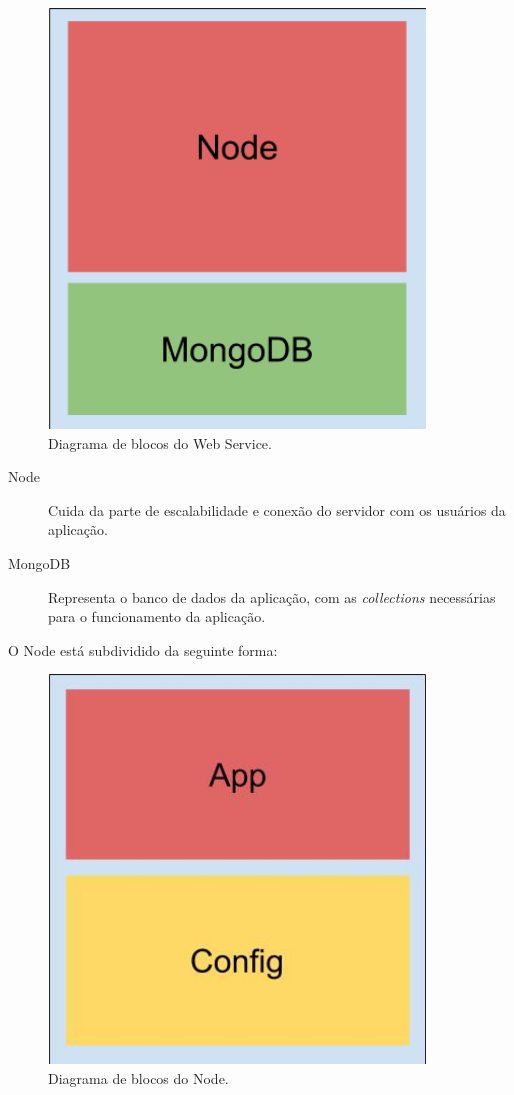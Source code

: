 \documentclass[
	12pt,				%
	oneside,			%
	a4paper,			%
	brazil				%
]{abntex2}
\begin{document}
{\begin{figure}[h]
\centering
\includegraphics[width=10cm, center]{images/brick_diagram_framework_webservice}
\caption{Diagrama de blocos do Web Service.}
\label{Rotulo}
\end{figure}

\begin{description}
\item[Node] Cuida da parte de escalabilidade e conexão do servidor com os usuários da aplicação.
\item[MongoDB] Representa o banco de dados da aplicação, com as \textit{collections} necessárias para o funcionamento da aplicação.
\end{description}

O Node está subdividido da seguinte forma:

\begin{figure}[h]
\centering
\includegraphics[width=10cm, center]{images/brick_diagram_node}
\caption{Diagrama de blocos do Node.}
\label{Rotulo}
\end{figure}

}
\end{document}
